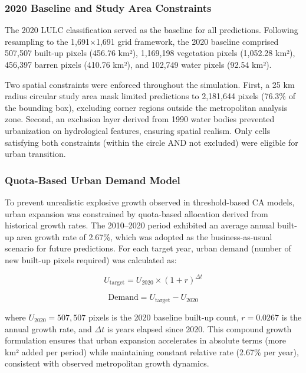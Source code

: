 \documentclass[conference]{IEEEtran}
\begin{document}
\subsubsection{2020 Baseline and Study Area Constraints}

The 2020 LULC classification served as the baseline for all predictions. Following resampling to the 1,691$\times$1,691 grid framework, the 2020 baseline comprised 507,507 built-up pixels (456.76 km²), 1,169,198 vegetation pixels (1,052.28 km²), 456,397 barren pixels (410.76 km²), and 102,749 water pixels (92.54 km²).

Two spatial constraints were enforced throughout the simulation. First, a 25 km radius circular study area mask limited predictions to 2,181,644 pixels (76.3\% of the bounding box), excluding corner regions outside the metropolitan analysis zone. Second, an exclusion layer derived from 1990 water bodies prevented urbanization on hydrological features, ensuring spatial realism. Only cells satisfying both constraints (within the circle AND not excluded) were eligible for urban transition.

\subsubsection{Quota-Based Urban Demand Model}

To prevent unrealistic explosive growth observed in threshold-based CA models, urban expansion was constrained by quota-based allocation derived from historical growth rates. The 2010--2020 period exhibited an average annual built-up area growth rate of 2.67\%, which was adopted as the business-as-usual scenario for future predictions. For each target year, urban demand (number of new built-up pixels required) was calculated as:

\begin{equation}
U_{\text{target}} = U_{2020} \times (1 + r)^{\Delta t}
\label{eq:demand_growth}
\end{equation}

\begin{equation}
\text{Demand} = U_{\text{target}} - U_{2020}
\label{eq:demand_calc}
\end{equation}

where $U_{2020} = 507{,}507$ pixels is the 2020 baseline built-up count, $r = 0.0267$ is the annual growth rate, and $\Delta t$ is years elapsed since 2020. This compound growth formulation ensures that urban expansion accelerates in absolute terms (more km² added per period) while maintaining constant relative rate (2.67\% per year), consistent with observed metropolitan growth dynamics.
\end{document}
